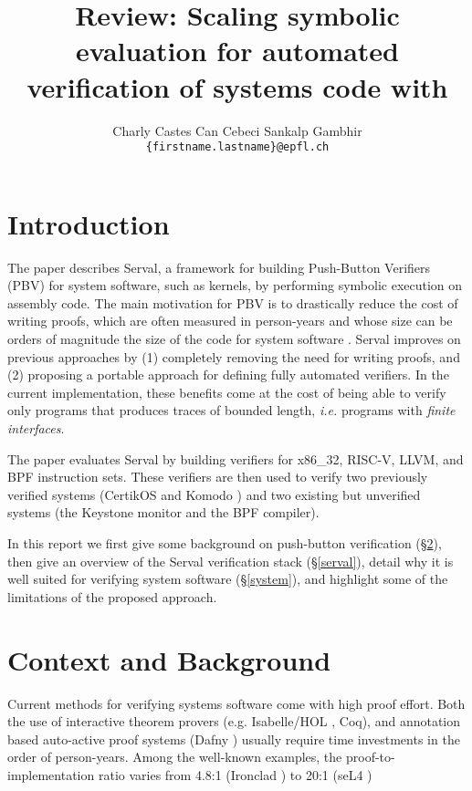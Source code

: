 \documentclass[11pt,a4paper]{article}
\title{Review: Scaling symbolic evaluation for automated verification of systems
code with \serval}
\author{
    Charly Castes \qquad Can Cebeci \qquad Sankalp Gambhir
    \\
    \texttt{\{firstname.lastname\}@epfl.ch}
    }
\newcommand{\ie}{\textit{i.e.}\xspace}
\newcommand{\amd}{\textsf{x86\_32}\xspace}
\newcommand{\riscv}{\textsf{RISC-V}\xspace}
\newcommand{\llvm}{\textsf{LLVM}\xspace}
\newcommand{\bpf}{\textsf{BPF}\xspace}
\newcommand{\serval}{Serval\xspace}
\begin{document}
\maketitle

\section{Introduction}
The paper describes \serval \cite{serval}, a framework for building Push-Button
Verifiers (PBV) for system software, such as kernels, by performing symbolic
execution on assembly code.
The main motivation for PBV is to drastically reduce the cost of writing proofs,
which are often measured in person-years and whose size can be orders of
magnitude the size of the code for system software \cite{sel4}.
\serval improves on previous approaches by (1) completely removing the need for
writing proofs, and (2) proposing a portable approach for defining fully
automated verifiers. 
In the current implementation, these benefits come at the cost of being able to
verify only programs that produces traces of bounded length, \ie{} programs with
\textit{finite interfaces}.

The paper evaluates \serval by building verifiers for \amd{}, \riscv{}, \llvm{},
and \bpf{} instruction sets.
These verifiers are then used to verify two previously verified systems
(CertikOS \cite{certikos} and Komodo \cite{komodo}) and two existing but
unverified systems (the Keystone monitor \cite{keystone} and the \bpf{}
compiler).

In this report we first give some background on push-button verification
(\S\ref{context}), then give an overview of the \serval verification stack
(\S\ref{serval}), detail why it is well suited for verifying system software
(\S\ref{system}), and highlight some of the limitations of the proposed
approach.

\section{Context and Background}
\label{context}

Current methods for verifying systems software come with high proof effort. Both
the use of interactive theorem provers (e.g. Isabelle/HOL \cite{isabelle}, Coq), and annotation
based auto-active proof systems (Dafny \cite{dafny}) usually require time investments in the
order of person-years. Among the well-known examples, the
proof-to-implementation ratio varies from 4.8:1 (Ironclad \cite{ironclad}) to 20:1 (seL4 \cite{sel4})
\end{document}
